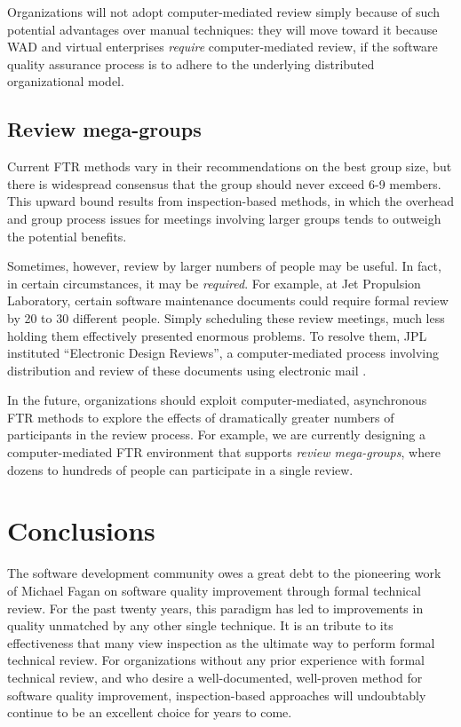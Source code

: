 Organizations will not adopt computer-mediated review simply because of
such potential advantages over manual techniques: they will move toward it
because WAD and virtual enterprises {\em require \/} computer-mediated
review, if the software quality assurance process is to adhere to the 
underlying distributed organizational model.



\subsection*{Review mega-groups}

Current FTR methods vary in their recommendations on the best group size,
but there is widespread consensus that the group should never exceed 6-9
members. This upward bound results from inspection-based methods, in which
the overhead and group process issues for meetings involving larger groups
tends to outweigh the potential benefits.

Sometimes, however, review by larger numbers of people may be useful.  In
fact, in certain circumstances, it may be {\em required}.  For example, at
Jet Propulsion Laboratory, certain software maintenance documents could
require formal review by 20 to 30 different people.  Simply
scheduling these review meetings, much less holding them effectively
presented enormous problems.  To resolve them, JPL instituted ``Electronic
Design Reviews'', a computer-mediated process involving distribution and
review of these documents using electronic mail  \cite{Kierk93}.

In the future, organizations should exploit computer-mediated, asynchronous
FTR methods to explore the effects of dramatically greater numbers of
participants in the review process.  For example, we are currently
designing a computer-mediated FTR environment that supports {\em review
mega-groups}, where dozens to hundreds of people can participate in a
single review.


\section*{Conclusions}

The software development community owes a great debt to the pioneering work
of Michael Fagan on software quality improvement through formal technical
review. For the past twenty years, this paradigm has led to improvements in
quality unmatched by any other single technique.  It is an tribute to its
effectiveness that many view inspection as the ultimate way to perform
formal technical review. For organizations without any prior experience
with formal technical review, and who desire a well-documented, well-proven
method for software quality improvement, inspection-based approaches will
undoubtably continue to be an excellent choice for years to come.

